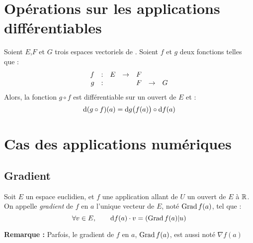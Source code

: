 \documentclass[11pt,a4paper,fleqn,pdftex]{report}
\begin{document}
\section{Opérations sur les applications différentiables} %
\label{sec:operations_sur_les_applications_differentiables}
\begin{itheorem}
Soient $E$,$F$ et $G$ trois espaces vectoriels   de .\newline
Soient $f$ et $g$ deux fonctions telles que :
\[
    \begin{array}{r c l c l c l}
    f &:& E &\to& F \\
    g &:& & & F & \to & G 
    \end{array}
\]
Alors, la fonction $g \circ f$ est différentiable sur un ouvert de $E$ et :
     \begin{equation}
     \mathrm{d} (g\circ f)(a) = \mathrm{d} g\big( f(a)\big) \circ \mathrm{d} f(a)
     \end{equation}
     
\end{itheorem}
\section{Cas des applications numériques} %
\label{sec:cas_des_applications_numeriques}
\subsection{Gradient} %
\label{sub:gradient}
\begin{dfn}[Gradient]
     Soit $E$ un espace euclidien, et $f$ une application allant de $U$ un ouvert de $E$ à $\mathbb{R}{}$. \\
     On appelle \emph{gradient} de $f$ en $a$ l'unique vecteur de $E$, noté $\Grad f(a)$, tel que :
     \begin{equation}
     \forall v\in E,\qquad \d f(a)\cdot v = \left( \Grad f(a) | u \right) 
     \end{equation}
\end{dfn}
\textbf{Remarque :} Parfois, le gradient de $f$ en $a$, $\Grad f(a)$, est aussi noté $\nabla f(a)$
\end{document}
